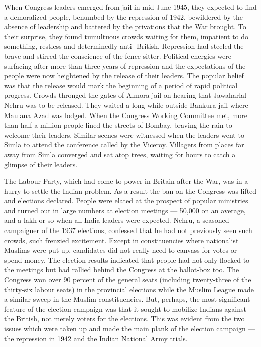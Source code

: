 When Congress leaders emerged from jail in mid-June 1945, they expected to find a demoralized people, benumbed by the repression of 1942, bewildered by the absence of leadership and battered by the privations that the War brought. To their surprise, they found tumultuous crowds waiting for them, impatient to do something, restless and determinedly anti- British. Repression had steeled the brave and stirred the conscience of the fence-sitter. Political energies were surfacing after more than three years of repression and the expectations of the people were now heightened by the release of their leaders. The popular belief was that the release would mark the beginning of a period of rapid political progress. Crowds thronged the gates of Almora jail on hearing that Jawaharlal Nehru was to be released. They waited a long while outside Bankura jail where Maulana Azad was lodged. When the Congress Working Committee met, more than half a million people lined the streets of Bombay, braving the rain to welcome their leaders. Similar scenes were witnessed when the leaders went to Simla to attend the conference called by the Viceroy. Villagers from places far away from Simla converged and sat atop trees, waiting for hours to catch a glimpse of their leaders. 

The Labour Party, which had come to power in Britain after the War, was in a hurry to settle the Indian problem. As a result the ban on the Congress was lifted and elections declared. People were elated at the prospect of popular ministries and turned out in large numbers at election meetings — 50,000 on an average, and a lakh or so when all India leaders were expected. Nehru, a seasoned campaigner of the 1937 elections, confessed that he had not previously seen such crowds, such frenzied excitement. Except in constituencies where nationalist Muslims were put up, candidates did not really need to canvass for votes or spend money. The election results indicated that people had not only flocked to the meetings but had rallied behind the Congress at the ballot-box too. The Congress won over 90 percent of the general seats (including twenty-three of the thirty-six labour seats) in the provincial elections while the Muslim League made a similar sweep in the Muslim constituencies. But, perhaps, the most significant feature of the election campaign was that it sought to mobilize Indians against the British, not merely voters for the elections. This was evident from the two issues which were taken up and made the main plank of the election campaign — the repression in 1942 and the Indian National Army trials. 

